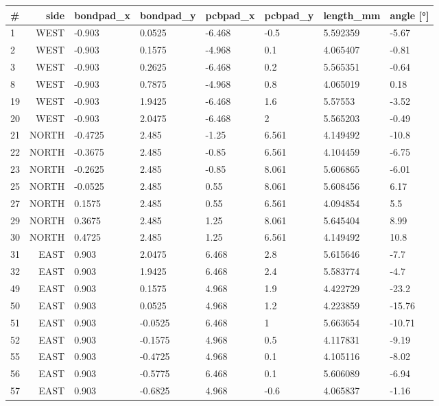 \documentclass{cernatsnote}
\begin{document}
\begin{figure}
\begin{longtable}{l r l l l l l l}
\toprule
\#  & side & bondpad\_x & bondpad\_y  & pcbpad\_x & pcbpad\_y & length\_mm  & angle  [°] \\

\midrule
1 & WEST & -0.903 & 0.0525 & -6.468 & -0.5 & 5.592359 & -5.67 \\
2 & WEST & -0.903 & 0.1575 & -4.968 & 0.1 & 4.065407 & -0.81 \\
3 & WEST & -0.903 & 0.2625 & -6.468 & 0.2 & 5.565351 & -0.64 \\
8 & WEST & -0.903 & 0.7875 & -4.968 & 0.8 & 4.065019 & 0.18 \\
19 & WEST & -0.903 & 1.9425 & -6.468 & 1.6 & 5.57553 & -3.52 \\
20 & WEST & -0.903 & 2.0475 & -6.468 & 2 & 5.565203 & -0.49 \\
21 & NORTH & -0.4725 & 2.485 & -1.25 & 6.561 & 4.149492 & -10.8 \\
22 & NORTH & -0.3675 & 2.485 & -0.85 & 6.561 & 4.104459 & -6.75 \\
23 & NORTH & -0.2625 & 2.485 & -0.85 & 8.061 & 5.606865 & -6.01 \\
25 & NORTH & -0.0525 & 2.485 & 0.55 & 8.061 & 5.608456 & 6.17 \\
27 & NORTH & 0.1575 & 2.485 & 0.55 & 6.561 & 4.094854 & 5.5 \\
29 & NORTH & 0.3675 & 2.485 & 1.25 & 8.061 & 5.645404 & 8.99 \\
30 & NORTH & 0.4725 & 2.485 & 1.25 & 6.561 & 4.149492 & 10.8 \\
31 & EAST & 0.903 & 2.0475 & 6.468 & 2.8 & 5.615646 & -7.7 \\
32 & EAST & 0.903 & 1.9425 & 6.468 & 2.4 & 5.583774 & -4.7 \\
49 & EAST & 0.903 & 0.1575 & 4.968 & 1.9 & 4.422729 & -23.2 \\
50 & EAST & 0.903 & 0.0525 & 4.968 & 1.2 & 4.223859 & -15.76 \\
51 & EAST & 0.903 & -0.0525 & 6.468 & 1 & 5.663654 & -10.71 \\
52 & EAST & 0.903 & -0.1575 & 4.968 & 0.5 & 4.117831 & -9.19 \\
55 & EAST & 0.903 & -0.4725 & 4.968 & 0.1 & 4.105116 & -8.02 \\
56 & EAST & 0.903 & -0.5775 & 6.468 & 0.1 & 5.606089 & -6.94 \\
57 & EAST & 0.903 & -0.6825 & 4.968 & -0.6 & 4.065837 & -1.16 \\

\end{longtable}
\end{figure}
\end{document}
